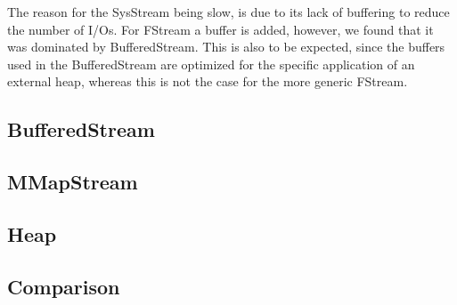 The reason for the SysStream being slow, is due to its lack of buffering to reduce the number of I/Os. For FStream a buffer is added, however, we found that it was dominated by BufferedStream. This is also to be expected, since the buffers used in the BufferedStream are optimized for the specific application of an external heap, whereas this is not the case for the more generic FStream.

\subsection{BufferedStream}

\subsection{MMapStream}


\subsection{Heap}


\subsection{Comparison}